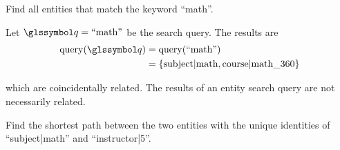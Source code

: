 		\begin{ex}
		\label{ex:entity-search}
			Find all entities that match the keyword ``math''.
			
			Let \(\q = \text{``math''}\) be the search query.  The results are
			\begin{align*}
				\query(\q) &= \query(\text{``math''}) \\
				&= \{\text{subject|math}, \text{course|math\_360}\}
			\end{align*}
			
			which are coincidentally related.  The results of an entity search query are not necessarily related.
		\end{ex}
		
		\begin{ex}
			Find the shortest path between the two entities with the unique identities of ``subject|math'' and ``instructor|5''.
			
		\end{ex}
		
		
		
		
		
		
		
		
		
		
		
		
		
		